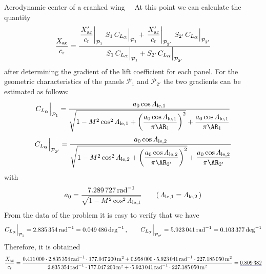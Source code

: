 \documentclass[[12pt,twoside]{book}
\begin{document}
\begin{myExampleX}{Aerodynamic center of a cranked wing}{\ \myIconGraph\ }
At this point we can calculate the quantity
\[
\frac{X_{\mathrm{ac}}}{c_\mathrm{r}}
  = \frac{
    \left.\dfrac{X'_{\mathrm{ac}}}{c_\mathrm{r}}\right|_{\mathcal{P}_{1}}
      \, S_{1} \, C_{L_\mathlarger{\alpha}}\Big|_{\mathcal{P}_{1}}
    +
    \left.\dfrac{X'_{\mathrm{ac}}}{c_\mathrm{r}}\right|_{\mathcal{P}_{2'}}
      \, S_{2'} \, C_{L_\mathlarger{\alpha}}\Big|_{\mathcal{P}_{2'}}
  }{
    S_{1} \, C_{L_\mathlarger{\alpha}}\Big|_{\mathcal{P}_{1}} 
    + S_{2'} \, C_{L_\mathlarger{\alpha}}\Big|_{\mathcal{P}_{2'}} 
  }
\]
after determining the gradient of the lift coefficient for each panel.
For the geometric characteristics of the panels $\mathcal{P}_{1}$ and
$\mathcal{P}_{2'}$ the two gradients can be estimated as follows:
\[
C_{L_\mathlarger{\alpha}}\Big|_{\mathcal{P}_{1}}
  =
  \frac{
    a_0 \cos \Lambda_{\mathrm{le,1}}
  }{
    \sqrt{
      1 - \Mach^2 \cos^2 \Lambda_{\mathrm{le,1}}
        + \left( \dfrac{ a_0 \cos \Lambda_{\mathrm{le,1}} }{ \pi \AR_1} \right)^2
    }
    +
    \dfrac{ a_0 \cos \Lambda_{\mathrm{le,1}} }{ \pi \AR_1}
  }
\]
\[
C_{L_\mathlarger{\alpha}}\Big|_{\mathcal{P}_{2'}}
  =
  \frac{
    a_0 \cos \Lambda_{\mathrm{le,2}}
  }{
    \sqrt{
      1 - \Mach^2 \cos^2 \Lambda_{\mathrm{le,2}}
        + \left( \dfrac{ a_0 \cos \Lambda_{\mathrm{le,2}} }{ \pi \AR_{2'}} \right)^2
    }
    +
    \dfrac{ a_0 \cos \Lambda_{\mathrm{le,2}} }{ \pi \AR_{2'}}
  }
\]
with
\[
a_0 = 
  \frac{
    \SI[round-precision=3]{\myCLAlphaAtMACWingRAD}{\radian^{-1}}
  }{
    \sqrt{ 1 - \Mach^2 \cos^2 \Lambda_{\mathrm{le,1}} }
  }
  \qquad (\, \Lambda_{\mathrm{le,1}} = \Lambda_{\mathrm{le,2}} \,)
\]
From the data of the problem it is easy to verify that we have
\[
C_{L_\mathlarger{\alpha}}\Big|_{\mathcal{P}_{1}}
  = \SI[round-precision=3]{\myCLAlphaPolhamusWingIRAD}{\radian^{-1}}
  = \SI[round-precision=4]{\myCLAlphaPolhamusWingIDEG}{\deg^{-1}}
\,,
\qquad
C_{L_\mathlarger{\alpha}}\Big|_{\mathcal{P}_{2'}}
  = \SI[round-precision=3]{\myCLAlphaPolhamusWingIIRAD}{\radian^{-1}}
  = \SI[round-precision=4]{\myCLAlphaPolhamusWingIIDEG}{\deg^{-1}}
\]
Therefore, it is obtained
\[
\frac{X_{\mathrm{ac}}}{c_\mathrm{r}}
  = \frac{
    \SI[round-precision=3]{\myXACOverChordRootDatcomWingI}{}
    \cdot \SI[round-precision=3]{\myCLAlphaPolhamusWingIRAD}{\radian^{-1}}
    \cdot \SI[round-precision=1]{\myAreaWingIMTsquared}{\metre^{2}}
    +
    \SI[round-precision=3]{\myXACOverChordRootDatcomWingII}{}
    \cdot \SI[round-precision=3]{\myCLAlphaPolhamusWingIIRAD}{\radian^{-1}}
    \cdot \SI[round-precision=1]{\myAreaWingIIPrimeMTsquared}{\metre^{2}}
  }{
    \SI[round-precision=3]{\myCLAlphaPolhamusWingIRAD}{\radian^{-1}}
    \cdot \SI[round-precision=1]{\myAreaWingIMTsquared}{\metre^{2}}
    +
    \cdot \SI[round-precision=3]{\myCLAlphaPolhamusWingIIRAD}{\radian^{-1}}
    \cdot \SI[round-precision=1]{\myAreaWingIIPrimeMTsquared}{\metre^{2}}  
  }
  = 
  \mathunderline{mydarkblue}{ \SI[round-precision=3]{\myXACOverChordRootDatcomWing}{} }
\]


\end{myExampleX}
\end{document}
